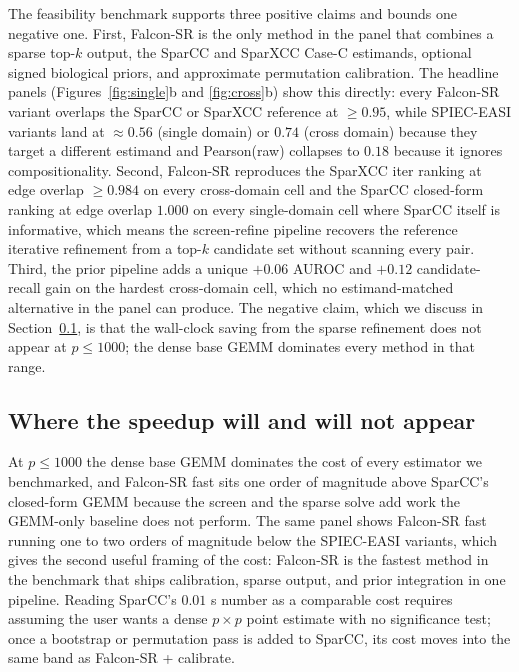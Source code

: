 \documentclass[unnumsec,webpdf,contemporary,large]{oup-authoring-template}
\theoremstyle{thmstyleone}
\theoremstyle{thmstyletwo}
\theoremstyle{thmstylethree}
\begin{document}
The feasibility benchmark supports three positive claims and bounds
one negative one. First, Falcon-SR is the only method in the panel
that combines a sparse top-$k$ output, the SparCC and SparXCC Case-C
estimands, optional signed biological priors, and approximate
permutation calibration. The headline panels (Figures~\ref{fig:single}b
and \ref{fig:cross}b) show this directly: every Falcon-SR variant
overlaps the SparCC or SparXCC reference at $\geq 0.95$, while
SPIEC-EASI variants land at $\approx 0.56$ (single domain) or $0.74$
(cross domain) because they target a different estimand and
Pearson(raw) collapses to $0.18$ because it ignores compositionality.
Second, Falcon-SR reproduces the SparXCC iter ranking at edge overlap
$\geq 0.984$ on every cross-domain cell and the SparCC closed-form
ranking at edge overlap $1.000$ on every single-domain cell where
SparCC itself is informative, which means the screen-refine pipeline
recovers the reference iterative refinement from a top-$k$ candidate
set without scanning every pair. Third, the prior pipeline adds a
unique $+0.06$ AUROC and $+0.12$ candidate-recall gain on the hardest
cross-domain cell, which no estimand-matched alternative in the panel
can produce. The negative claim, which we discuss in
Section~\ref{sec:discuss-cost}, is that the wall-clock saving from
the sparse refinement does not appear at $p \leq 1000$; the dense
base GEMM dominates every method in that range.

\subsection{Where the speedup will and will not appear}\label{sec:discuss-cost}

At $p \leq 1000$ the dense base GEMM dominates the cost of every
estimator we benchmarked, and Falcon-SR fast sits one order of
magnitude above SparCC's closed-form GEMM because the screen and the
sparse solve add work the GEMM-only baseline does not perform. The
same panel shows Falcon-SR fast running one to two orders of
magnitude below the SPIEC-EASI variants, which gives the second
useful framing of the cost: Falcon-SR is the fastest method in the
benchmark that ships calibration, sparse output, and prior
integration in one pipeline. Reading SparCC's $0.01$ s number as a
comparable cost requires assuming the user wants a dense $p \times p$
point estimate with no significance test; once a bootstrap or
permutation pass is added to SparCC, its cost moves into the same
band as Falcon-SR + calibrate.
\end{document}
